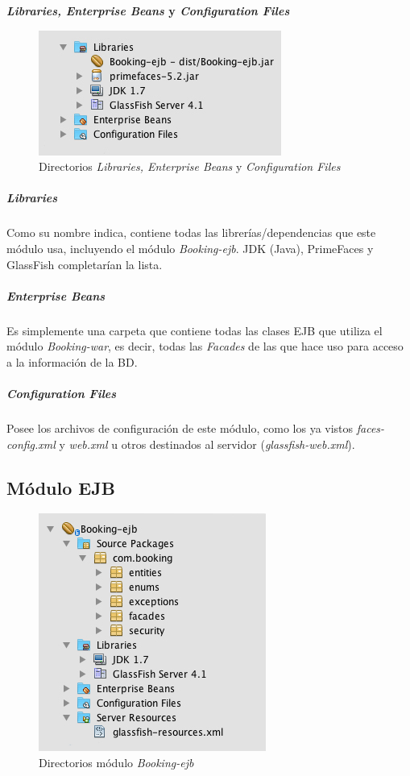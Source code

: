 \textbf{\textit{Libraries, Enterprise Beans} y \textit{Configuration Files}}
\\

\begin{figure}
\centering
  \includegraphics[scale=.70]{img/ficheros/otros-directorios-web.jpg}
  \caption{Directorios \textit{Libraries, Enterprise Beans} y \textit{Configuration Files}}
  \label{fig:otros-directorios-web}
\end{figure}

\subparagraph{\textit{Libraries}}

Como su nombre indica, contiene todas las librerías/dependencias que este módulo usa, incluyendo el módulo \textit{Booking-ejb}. JDK (Java), PrimeFaces y GlassFish completarían la lista. \\

\subparagraph{\textit{Enterprise Beans}} 

Es simplemente una carpeta que contiene todas las clases EJB que utiliza el módulo \textit{Booking-war}, es decir, todas las \textit{Facades} de las que hace uso para acceso a la información de la BD. \\

\subparagraph{\textit{Configuration Files}} 

Posee los archivos de configuración de este módulo, como los ya vistos \textit{faces-config.xml} y \textit{web.xml} u otros destinados al servidor (\textit{glassfish-web.xml}).


\subsection{Módulo EJB}

\begin{figure}
\centering
  \includegraphics[scale=.70]{img/ficheros/ficheros-ejb.jpg}
  \caption{Directorios módulo \textit{Booking-ejb}}
  \label{fig:ficheros-ejb}
\end{figure}

